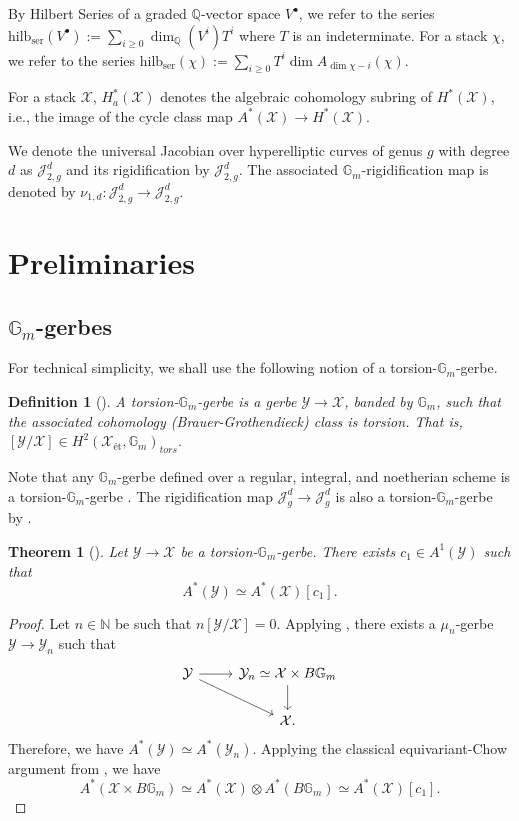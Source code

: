 \documentclass[11pt]{amsart}
\newtheorem{theorem}{Theorem}[section]
\newtheorem{definition}{Definition}[subsection]
\theoremstyle{definition}
\newcommand{\hilb}{\mathrm{hilb}_{\mathrm{ser}}}
\newcommand{\ri}{\rightarrow}
\newcommand{\J}{\mathscr{J}}
\newcommand{\jac}{\mathcal{J}}
\newcommand{\Q}{\mathbb{Q}}
\newcommand{\gm}{\mathbb{G}_m}
\begin{document}
    By Hilbert Series of a graded $\Q$-vector space $V^\bullet$, we refer to the series $\hilb(V^\bullet) := \sum_{i\geq 0}\dim_\Q(V^i)T^i$ where $T$ is an indeterminate. For a stack $\chi$, we refer to the series $\hilb(\chi):= \sum_{i\geq 0}T^i\dim A_{\dim \chi - i}(\chi) $.

For a stack $\mathcal{X}$, $H^*_a(\mathcal{X})$ denotes the algebraic cohomology subring of $H^*(\mathcal{X})$, i.e., the image of the cycle class map $A^*(\mathcal{X})\ri H^*(\mathcal{X})$.


We denote the universal Jacobian over hyperelliptic curves of genus $g$ with degree $d$ as $\J^d_{2,g}$ and its rigidification by $\jac^d_{2,g}$. The associated $\mathbb{G}_m$-rigidification map is denoted by $\nu_{1,d}:\J^d_{2,g}\ri\jac^d_{2,g}$.
\section{Preliminaries}


\subsection{$\mathbb{G}_m$-gerbes}
For technical simplicity, we shall use the following notion of a torsion-$\gm$-gerbe. 
\begin{definition}[\cite{min-shen}]
    A \textit{torsion-$\mathbb{G}_m$-gerbe} is a gerbe $\mathcal{Y}\ri \mathcal{X}$, banded by $\mathbb{G}_m$, such that the associated cohomology (Brauer-Grothendieck) class is torsion. That is, $[\mathcal{Y}/\mathcal{X}]\in H^2(\mathcal{X}_{\text{\'et}},\mathbb{G}_m)_{tors}$.
\end{definition}
Note that any $\gm$-gerbe defined over a regular, integral, and noetherian scheme is a torsion-$\gm$-gerbe \cite[Corollaire 1.8]{grothendieck}. The rigidification map $\J^d_{g}\ri \jac^d_{g}$ is also a torsion-$\gm$-gerbe by \cite[Theorem 6.4]{melo}.
\begin{theorem}[\cite{larson-24}]\label{thm:gerbe-ring}
    Let $\mathcal{Y}\ri \mathcal{X}$ be a torsion-$\gm$-gerbe. There exists $c_1\in A^1(\mathcal{Y})$ such that
    $$A^*(\mathcal{Y}) \simeq A^*(\mathcal{X})[c_1].$$
\end{theorem}
\begin{proof}
    Let $n\in \mathbb{N}$ be such that $n[\mathcal{Y}/\mathcal{X}] = 0$. Applying \cite[Lemma 3.1.1.8]{lieblich}, there exists a $\mu_n$-gerbe $\mathcal{Y}\ri\mathcal{Y}_n$ such that
$$\begin{tikzcd}
    \mathcal{Y}\ar[r]\ar[rd]&\mathcal{Y}_n\simeq \mathcal{X}\times B\gm\ar[d]\\
    &\mathcal{X}.
\end{tikzcd}$$
Therefore, we have $A^*(\mathcal{Y})\simeq A^*(\mathcal{Y}_n)$. Applying the classical equivariant-Chow argument from \cite{edidin-graham}, we have 
$$A^*(\mathcal{X}\times B\gm)\simeq A^*(\mathcal{X})\otimes A^*(B\gm)\simeq A^*(\mathcal{X})[c_1].$$
\end{proof}
\end{document}
